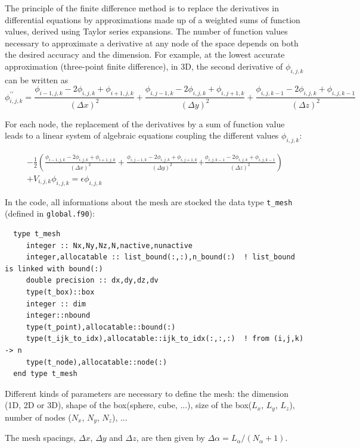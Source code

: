 \documentclass[11pt,a4paper]{article}
\begin{document}
The principle of the finite difference method is to replace the derivatives in differential equations by approximations made up of a weighted sums of function values, derived using Taylor series expansions.
The number of function values necessary to approximate a derivative at any node  of the space depends on both the desired accuracy and the dimension.
For example, at the lowest accurate approximation (three-point finite difference), in  3D, the second derivative of $\phi_{i,j,k}$ can be written as
\begin{equation}
  \phi^{\prime\prime}_{i,j,k}=\frac{\phi_{i-1,j,k}-2\phi_{i,j,k}+\phi_{i+1,j,k}}{(\Delta x)^2}
+  \frac{\phi_{i,j-1,k}-2\phi_{i,j,k}+\phi_{i,j+1,k}}{(\Delta y)^2}
+  \frac{\phi_{i,j,k-1}-2\phi_{i,j,k}+\phi_{i,j,k-1}}{(\Delta z)^2}
\end{equation}

For each node, the replacement of the derivatives by a sum of function value leads to a linear system of algebraic equations coupling the different values $\phi_{i,j,k}$:

\begin{eqnarray}
  \label{eq:2}
-\frac{1}{2}\left(  \frac{\phi_{i-1,j,k}-2\phi_{i,j,k}+\phi_{i+1,j,k}}{(\Delta x)^2}\right.
 +  \frac{\phi_{i,j-1,k}-2\phi_{i,j,k}+\phi_{i,j+1,k}}{(\Delta y)^2}
 \left. +  \frac{\phi_{i,j,k-1}-2\phi_{i,j,k}+\phi_{i,j,k-1}}{(\Delta z)^2}\right)\nonumber\\
+V_{i,j,k} \phi_{i,j,k}=\epsilon\phi_{i,j,k}
\end{eqnarray}


In the code, all informations about the mesh are stocked the data type \verb+t_mesh+ (defined in \verb+global.f90+):
\begin{verbatim}
  type t_mesh
     integer :: Nx,Ny,Nz,N,nactive,nunactive
     integer,allocatable :: list_bound(:,:),n_bound(:)  ! list_bound is linked with bound(:) 
     double precision :: dx,dy,dz,dv
     type(t_box)::box
     integer :: dim
     integer::nbound
     type(t_point),allocatable::bound(:)
     type(t_ijk_to_idx),allocatable::ijk_to_idx(:,:,:)  ! from (i,j,k) -> n
     type(t_node),allocatable::node(:)
  end type t_mesh
\end{verbatim}
Different kinds of parameters are necessary to define the mesh: the dimension (1D, 2D or 3D), shape of the box(sphere, cube, ...), size of the box($L_x$, $L_y$, $L_z$), number of nodes ($N_x$, $N_y$, $N_z$), ...

The mesh spacings, $\Delta x$, $\Delta y$ and  $\Delta z$, are then given by $  \Delta\alpha=L_\alpha/(N_\alpha+1)$.
\end{document}
